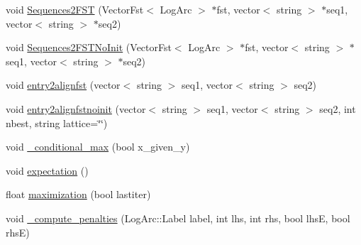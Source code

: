 \begin{DoxyCompactItemize}
\item 
void \hyperlink{classfst_1_1_m2_m_fst_aligner_a1db289de9291e452e50ee2b49bab837d}{Sequences2\+F\+ST} (Vector\+Fst$<$ Log\+Arc $>$ $\ast$fst, vector$<$ string $>$ $\ast$seq1, vector$<$ string $>$ $\ast$seq2)
\item 
void \hyperlink{classfst_1_1_m2_m_fst_aligner_a81d549823f9f06ced0fadf7ab097a8e3}{Sequences2\+F\+S\+T\+No\+Init} (Vector\+Fst$<$ Log\+Arc $>$ $\ast$fst, vector$<$ string $>$ $\ast$seq1, vector$<$ string $>$ $\ast$seq2)
\item 
void \hyperlink{classfst_1_1_m2_m_fst_aligner_a626abb1ec3fa645300b81878b3f622e1}{entry2alignfst} (vector$<$ string $>$ seq1, vector$<$ string $>$ seq2)
\item 
void \hyperlink{classfst_1_1_m2_m_fst_aligner_a2bbe32f59993d307dea9225ea38eb545}{entry2alignfstnoinit} (vector$<$ string $>$ seq1, vector$<$ string $>$ seq2, int nbest, string lattice=\char`\"{}\char`\"{})
\item 
void \hyperlink{classfst_1_1_m2_m_fst_aligner_a0b3cc458129b1af2ffda2dfda3247339}{\+\_\+conditional\+\_\+max} (bool x\+\_\+given\+\_\+y)
\item 
void \hyperlink{classfst_1_1_m2_m_fst_aligner_a11a90035d22ec0cafb2f5129a43c7346}{expectation} ()
\item 
float \hyperlink{classfst_1_1_m2_m_fst_aligner_a34e2870052782eb77c63453cb0ce0a59}{maximization} (bool lastiter)
\item 
void \hyperlink{classfst_1_1_m2_m_fst_aligner_aa4b94a3f28c9d09f4616aa670869e762}{\+\_\+compute\+\_\+penalties} (Log\+Arc\+::\+Label label, int lhs, int rhs, bool lhsE, bool rhsE)
\end{DoxyCompactItemize}
